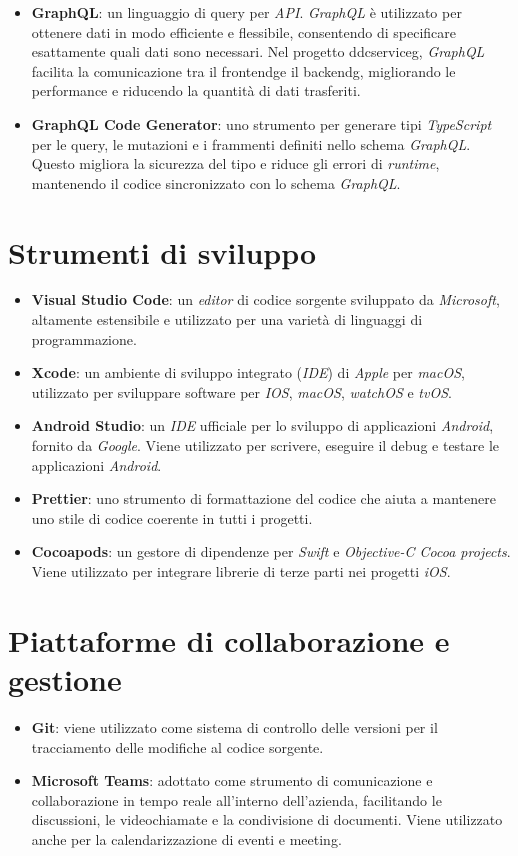 \begin{itemize}
    \item \textbf{GraphQL}: un linguaggio di query per \textit{API}\glox.
    \textit{GraphQL} è utilizzato per ottenere dati in modo efficiente e flessibile, consentendo di specificare esattamente quali dati sono necessari.
    Nel progetto \gls{ddcserviceg}\glox, \textit{GraphQL} facilita la comunicazione tra il \gls{frontendg}\glox e il \gls{backendg}\glox, migliorando le performance e riducendo la quantità di dati trasferiti.
    \item \textbf{GraphQL Code Generator}: uno strumento per generare tipi \textit{TypeScript} per le query, le mutazioni e i frammenti definiti nello schema \textit{GraphQL}. Questo migliora la sicurezza del tipo e riduce gli errori di \textit{runtime}, mantenendo il codice sincronizzato con lo schema \textit{GraphQL}.
\end{itemize}


\section{Strumenti di sviluppo}
\begin{itemize}
\item \textbf{Visual Studio Code}: un \textit{editor} di codice sorgente sviluppato da \textit{Microsoft}, altamente estensibile e utilizzato per una varietà di linguaggi di programmazione.
\item \textbf{Xcode}: un ambiente di sviluppo integrato (\textit{IDE}) di \textit{Apple} per \textit{macOS}, utilizzato per sviluppare software per \textit{IOS}, \textit{macOS}, \textit{watchOS} e \textit{tvOS}.
\item \textbf{Android Studio}: un \textit{IDE} ufficiale per lo sviluppo di applicazioni \textit{Android}, fornito da \textit{Google}. Viene utilizzato per scrivere, eseguire il debug e testare le applicazioni \textit{Android}.
\item \textbf{Prettier}: uno strumento di formattazione del codice che aiuta a mantenere uno stile di codice coerente in tutti i progetti.
\item \textbf{Cocoapods}: un gestore di dipendenze per \textit{Swift} e \textit{Objective-C Cocoa projects}. Viene utilizzato per integrare librerie di terze parti nei progetti \textit{iOS}.
\end{itemize}

\section{Piattaforme di collaborazione e gestione}
\begin{itemize}
\item \textbf{Git}: viene utilizzato come sistema di controllo delle versioni per il tracciamento delle modifiche al codice sorgente.
\item \textbf{Microsoft Teams}: adottato come strumento di comunicazione e collaborazione in tempo reale all'interno dell'azienda, facilitando le discussioni, le videochiamate e la condivisione di documenti. Viene utilizzato anche per la calendarizzazione di eventi e meeting.
\end{itemize}

